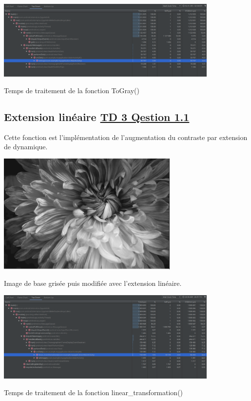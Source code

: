 \documentclass{article}
\begin{document}
\begin{center} 
    \includegraphics[width=11cm]{../TempsToGray}

    Temps de traitement de la fonction ToGray()
    \end{center}

\subsection{Extension linéaire \underline{TD 3 Qestion 1.1}}
Cette fonction est l'implémentation de l'augmentation du contraste par extension de dynamique.
\bigbreak

\begin{center} 
    \includegraphics[width=9cm]{../ExtensionLineaire}

    Image de base grisée puis modifiée avec l'extension linéaire.
    \end{center}

\begin{center} 
    \includegraphics[width=11cm]{../TempsLinearTransformation}

    Temps de traitement de la fonction linear\_transformation()
    \end{center}
\end{document}
